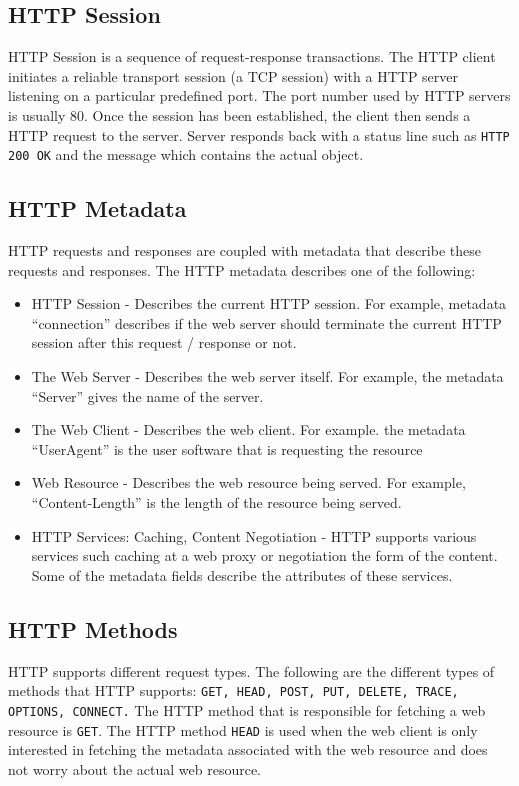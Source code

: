 \subsection{HTTP Session}
HTTP Session is a sequence of request-response transactions. The HTTP
client initiates a reliable transport session (a TCP session) with a
HTTP server listening on a particular predefined port. The port number
used by HTTP servers is usually 80. Once the session has been
established, the client then sends a HTTP request to the
server. Server responds back with a status line such as \texttt{HTTP
  200 OK} and the message which contains the actual object.

\subsection{HTTP Metadata}
HTTP requests and responses are coupled with metadata that describe
these requests and responses. The HTTP metadata describes one of the
following:
\begin{itemize}
\item{HTTP Session - Describes the current HTTP session. For example,
  metadata ``connection'' describes if the web server should
  terminate the current HTTP session after this request / response or not.}
\item{The Web Server - Describes the web server itself. For example,
  the metadata ``Server'' gives the name of the server.}
\item{The Web Client - Describes the web client. For example. the
  metadata ``UserAgent'' is the user software that is requesting the resource}
\item{Web Resource - Describes the web resource being served. For
  example, ``Content-Length'' is the length of the resource being served.}
\item{HTTP Services: Caching, Content Negotiation - HTTP supports
  various services such caching at a web proxy or negotiation the form
  of the content. Some of the metadata fields describe the attributes
  of these services.}
\end{itemize}

\subsection{HTTP Methods}
HTTP supports different request types. The following are the different
types of methods that HTTP supports: \texttt{GET, HEAD, POST, PUT,
  DELETE, TRACE, OPTIONS, CONNECT.} The HTTP method that is
responsible for fetching a web resource is \texttt{GET}. The HTTP
method \texttt{HEAD} is used when the web client is only interested
in fetching the metadata associated with the web resource and does not
worry about the actual web resource.

